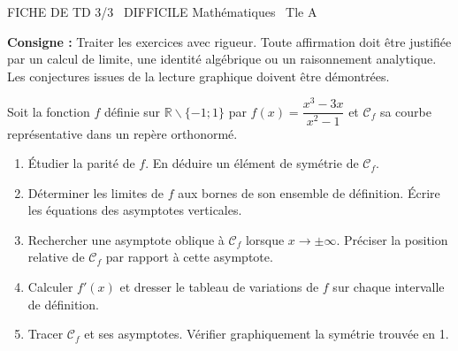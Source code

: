 \documentclass[11pt]{article}
\def\setminus{\mathbin{\backslash}}\let\smallsetminus\setminus
\begin{document}
\begin{tcolorbox}[enhanced,colback=popink,colframe=popink,arc=10pt,boxrule=0pt,left=12pt,right=12pt,top=9pt,bottom=9pt]
{\color{white}\popxbold\small FICHE DE TD 3/3 \textbullet\ DIFFICILE \hfill Mathématiques \textbullet\ Tle A\par}
\end{tcolorbox}
\vspace{4pt}
\noindent\textbf{Consigne :} Traiter les exercices avec rigueur. Toute affirmation doit être justifiée par un calcul de limite, une identité algébrique ou un raisonnement analytique. Les conjectures issues de la lecture graphique doivent être démontrées.

\begin{exercice}
Soit la fonction $f$ définie sur $\mathbb{R}\setminus\{-1;1\}$ par $f(x)=\dfrac{x^3-3x}{x^2-1}$ et $\mathcal{C}_f$ sa courbe représentative dans un repère orthonormé.
\begin{enumerate}
    \item Étudier la parité de $f$. En déduire un élément de symétrie de $\mathcal{C}_f$.
    \item Déterminer les limites de $f$ aux bornes de son ensemble de définition. Écrire les équations des asymptotes verticales.
    \item Rechercher une asymptote oblique à $\mathcal{C}_f$ lorsque $x\to\pm\infty$. Préciser la position relative de $\mathcal{C}_f$ par rapport à cette asymptote.
    \item Calculer $f'(x)$ et dresser le tableau de variations de $f$ sur chaque intervalle de définition.
    \item Tracer $\mathcal{C}_f$ et ses asymptotes. Vérifier graphiquement la symétrie trouvée en 1.
\end{enumerate}
\end{exercice}
\end{document}
